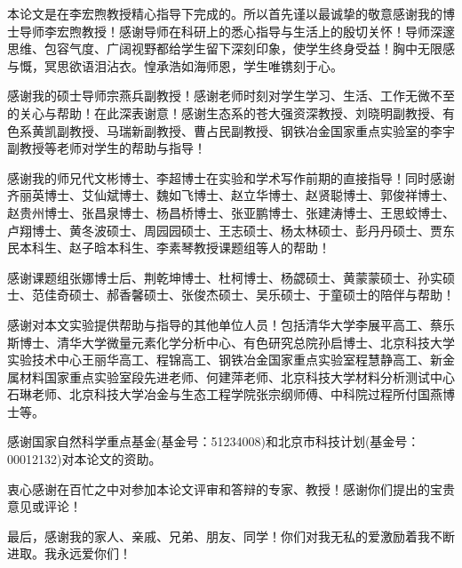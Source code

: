 \begin{acknowledgements}
本论文是在李宏煦教授精心指导下完成的。所以首先谨以最诚挚的敬意感谢我的博士导师李宏煦教授！感谢导师在科研上的悉心指导与生活上的殷切关怀！导师深邃思维、包容气度、广阔视野都给学生留下深刻印象，使学生终身受益！胸中无限感与慨，冥思欲语泪沾衣。惶承浩如海师恩，学生唯镌刻于心。

感谢我的硕士导师宗燕兵副教授！感谢老师时刻对学生学习、生活、工作无微不至的关心与帮助！在此深表谢意！感谢生态系的苍大强资深教授、刘晓明副教授、有色系黄凯副教授、马瑞新副教授、曹占民副教授、钢铁冶金国家重点实验室的李宇副教授等老师对学生的帮助与指导！

感谢我的师兄代文彬博士、李超博士在实验和学术写作前期的直接指导！同时感谢齐丽英博士、艾仙斌博士、魏如飞博士、赵立华博士、赵贤聪博士、郭俊祥博士、赵贵州博士、张昌泉博士、杨昌桥博士、张亚鹏博士、张建涛博士、王思蛟博士、卢翔博士、黄冬波硕士、周园园硕士、王志硕士、杨太林硕士、彭丹丹硕士、贾东民本科生、赵子晗本科生、李素琴教授课题组等人的帮助！

感谢课题组张娜博士后、荆乾坤博士、杜柯博士、杨勰硕士、黄蒙蒙硕士、孙实硕士、范佳奇硕士、郝香馨硕士、张俊杰硕士、吴乐硕士、于童硕士的陪伴与帮助！

感谢对本文实验提供帮助与指导的其他单位人员！包括清华大学李展平高工、蔡乐斯博士、清华大学微量元素化学分析中心、有色研究总院孙启博士、北京科技大学实验技术中心王丽华高工、程锦高工、钢铁冶金国家重点实验室程慧静高工、新金属材料国家重点实验室段先进老师、何建萍老师、北京科技大学材料分析测试中心石琳老师、北京科技大学冶金与生态工程学院张宗纲师傅、中科院过程所付国燕博士等。

感谢国家自然科学重点基金(基金号：51234008)和北京市科技计划(基金号：00012132)对本论文的资助。


衷心感谢在百忙之中对参加本论文评审和答辩的专家、教授！感谢你们提出的宝贵意见或评论！

最后，感谢我的家人、亲戚、兄弟、朋友、同学！你们对我无私的爱激励着我不断进取。我永远爱你们！

\end{acknowledgements}